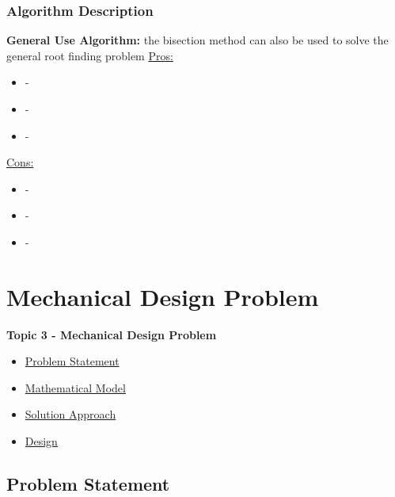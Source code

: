 \documentclass[fleqn]{ltx-talk} %
\newcommand{\sectionIVtitle}{Mechanical Design Problem}
\newcommand{\sectionIIIsubsectionIIItitle}{Algorithm Description}
\newcommand{\sectionIVsubsectionItitle}{Problem Statement}
\newcommand{\sectionIVsubsectionIItitle}{Mathematical Model}
\newcommand{\sectionIVsubsectionIIItitle}{Solution Approach}
\newcommand{\sectionIVsubsectionIVtitle}{Design}
\begin{document}
			\begin{frame}
				\frametitle{\sectionIIIsubsectionIIItitle}
				\bigskip

				\textbf{General Use Algorithm:} the bisection method can also be used to solve the general root finding problem \vspcc
				\underline{Pros:}
				\begin{itemize}
			    	\item -
			    	\item -
			    	\item -
				\end{itemize} 

				\underline{Cons:}
				\begin{itemize}
					\item -
					\item -
					\item -
				\end{itemize}
				
				\btVFill
			\end{frame}



	\section{\sectionIVtitle}\label{sectionIV}

		\begin{frame}
			\large \textbf{Topic 3 - \sectionIVtitle} \vspace{3mm}\\

			\begin{itemize}
				\item \hyperref[sectionIVsubsectionI]{\sectionIVsubsectionItitle} \vspc %
				\item \hyperref[sectionIVsubsectionII]{\sectionIVsubsectionIItitle} \vspc %
				\item \hyperref[sectionIVsubsectionIII]{\sectionIVsubsectionIIItitle} \vspc %
				\item \hyperref[sectionIVsubsectionIV]{\sectionIVsubsectionIVtitle} \vspc %
			\end{itemize}

		\end{frame}

		\subsection{\sectionIVsubsectionItitle}\label{sectionIVsubsectionI}
\end{document}
